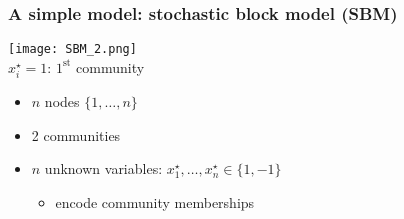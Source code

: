 \documentclass[compress,
mathserif,wide,%
]{beamer}
\begin{document}
\begin{frame}
	\frametitle{A simple model: stochastic block model (SBM)}


\vspace{-1em}

\begin{center}
	\texttt{[image: SBM\_2.png]}  \\
	  {\small $x_i^{\star}=1$: $1^{\text{st}}$ community}   
\end{center}

\begin{itemize}
	\itemsep0.5em
	\item  $n$ nodes $\{1,\ldots,n\}$
	\item  2 communities
	\item  $n$ unknown variables:  $x_1^{\star}, \ldots, x_n^{\star} \in \{1,-1\}$ 
	\begin{itemize}
		\item encode community memberships
	\end{itemize}

	
\end{itemize}



\end{frame}
\end{document}
